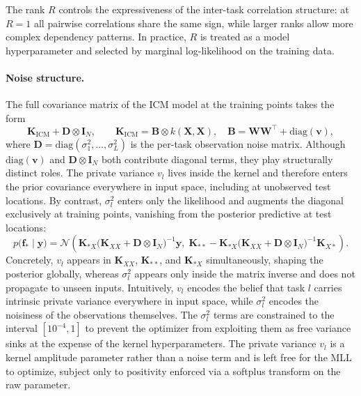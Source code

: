\documentclass[11pt]{article}
\begin{document}
The rank $R$ controls the expressiveness of the inter-task correlation structure: at
$R = 1$ all pairwise correlations share the same sign, while larger ranks allow more
complex dependency patterns. In practice, $R$ is treated as a model hyperparameter
and selected by marginal log-likelihood on the training data.

\paragraph{Noise structure.}
The full covariance matrix of the ICM model at the training points takes the form
%
\begin{equation}
    \mathbf{K}_{\mathrm{ICM}} + \mathbf{D} \otimes \mathbf{I}_N,
    \qquad
    \mathbf{K}_{\mathrm{ICM}} = \mathbf{B} \otimes k(\mathbf{X}, \mathbf{X}),
    \quad
    \mathbf{B} = \mathbf{W}\mathbf{W}^\top + \mathrm{diag}(\mathbf{v}),
\end{equation}
%
where $\mathbf{D} = \mathrm{diag}(\sigma^2_1, \ldots, \sigma^2_L)$ is the per-task
observation noise matrix. Although $\mathrm{diag}(\mathbf{v})$ and
$\mathbf{D} \otimes \mathbf{I}_N$ both contribute diagonal terms, they play
structurally distinct roles. The private variance $v_l$ lives inside the kernel and
therefore enters the prior covariance everywhere in input space, including at
unobserved test locations. By contrast, $\sigma^2_l$ enters only the likelihood and
augments the diagonal exclusively at training points, vanishing from the posterior
predictive at test locations:
%
\begin{equation}
    p\bigl(\mathbf{f}_* \mid \mathbf{y}\bigr) = \mathcal{N}\!\left(
        \mathbf{K}_{*X}\bigl(\mathbf{K}_{XX} + \mathbf{D} \otimes \mathbf{I}_N\bigr)^{-1}\mathbf{y},\;
        \mathbf{K}_{**} - \mathbf{K}_{*X}\bigl(\mathbf{K}_{XX} + \mathbf{D} \otimes \mathbf{I}_N\bigr)^{-1}\mathbf{K}_{X*}
    \right).
\end{equation}
%
Concretely, $v_l$ appears in $\mathbf{K}_{XX}$, $\mathbf{K}_{**}$, and
$\mathbf{K}_{*X}$ simultaneously, shaping the posterior globally, whereas $\sigma^2_l$
appears only inside the matrix inverse and does not propagate to unseen inputs.
Intuitively, $v_l$ encodes the belief that task $l$ carries intrinsic private
variance everywhere in input space, while $\sigma^2_l$ encodes the noisiness of the
observations themselves. The $\sigma^2_l$ terms are constrained to the interval
$[10^{-4}, 1]$ to prevent the optimizer from exploiting them as free variance sinks
at the expense of the kernel hyperparameters. The private variance $v_l$ is a kernel
amplitude parameter rather than a noise term and is left free for the MLL to
optimize, subject only to positivity enforced via a softplus transform on the raw
parameter.
\end{document}
